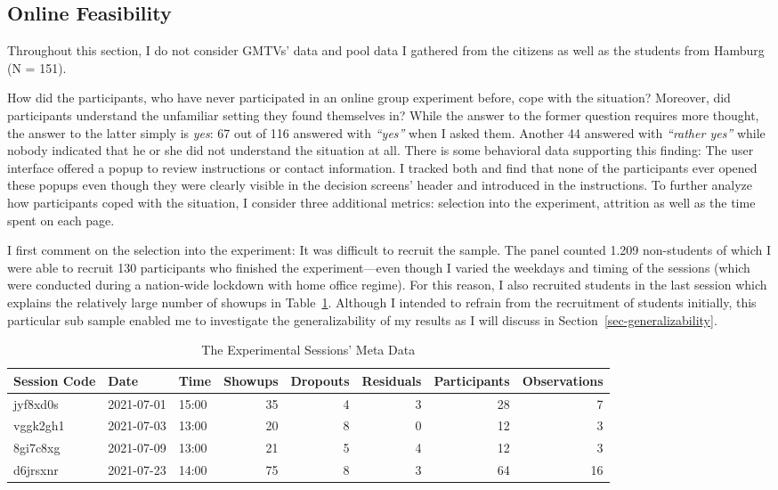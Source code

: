 \documentclass[
  authoryear,
  review,
  3p,
  onecolumn]{elsarticle}
\begin{document}
\hypertarget{sec-feasibility}{%
\subsection{Online Feasibility}\label{sec-feasibility}}

Throughout this section, I do not consider GMTVs' data and pool data I
gathered from the citizens as well as the students from Hamburg (N =
151).

How did the participants, who have never participated in an online group
experiment before, cope with the situation? Moreover, did participants
understand the unfamiliar setting they found themselves in? While the
answer to the former question requires more thought, the answer to the
latter simply is \emph{yes}: 67 out of 116 answered with \emph{``yes''}
when I asked them. Another 44 answered with \emph{``rather yes''} while
nobody indicated that he or she did not understand the situation at all.
There is some behavioral data supporting this finding: The user
interface offered a popup to review instructions or contact information.
I tracked both and find that none of the participants ever opened these
popups even though they were clearly visible in the decision screens'
header and introduced in the instructions. To further analyze how
participants coped with the situation, I consider three additional
metrics: selection into the experiment, attrition as well as the time
spent on each page.

I first comment on the selection into the experiment: It was difficult
to recruit the sample. The panel counted 1.209 non-students of which I
were able to recruit 130 participants who finished the experiment---even
though I varied the weekdays and timing of the sessions (which were
conducted during a nation-wide lockdown with home office regime). For
this reason, I also recruited students in the last session which
explains the relatively large number of showups in Table~\ref{tbl-meta}.
Although I intended to refrain from the recruitment of students
initially, this particular sub sample enabled me to investigate the
generalizability of my results as I will discuss in
Section~\ref{sec-generalizability}.

\hypertarget{tbl-meta}{}
\begin{table}
\caption{\label{tbl-meta}The Experimental Sessions' Meta Data }\tabularnewline

\centering
\begin{tabular}{l|l|l|r|r|r|r|r}
\hline
Session Code & Date & Time & Showups & Dropouts & Residuals & Participants & Observations\\
\hline
jyf8xd0s & 2021-07-01 & 15:00 & 35 & 4 & 3 & 28 & 7\\
\hline
vggk2gh1 & 2021-07-03 & 13:00 & 20 & 8 & 0 & 12 & 3\\
\hline
8gi7c8xg & 2021-07-09 & 13:00 & 21 & 5 & 4 & 12 & 3\\
\hline
d6jrsxnr & 2021-07-23 & 14:00 & 75 & 8 & 3 & 64 & 16\\
\hline
\end{tabular}
\end{table}
\end{document}
